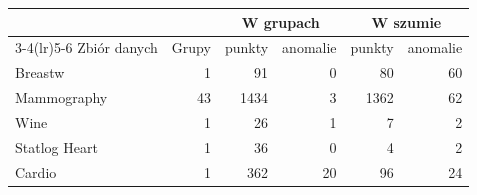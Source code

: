 \begin{tabular}{lrrrrr}
\toprule
 & & \multicolumn{2}{c}{W grupach} & \multicolumn{2}{c}{W szumie} \\
\cmidrule(lr){3-4}\cmidrule(lr){5-6}
Zbiór danych & Grupy & punkty & anomalie & punkty & anomalie \\
\midrule
Breastw & 1 & 91 & 0 & 80 & 60 \\
Mammography & 43 & 1434 & 3 & 1362 & 62 \\
Wine & 1 & 26 & 1 & 7 & 2 \\
Statlog Heart & 1 & 36 & 0 & 4 & 2 \\
Cardio & 1 & 362 & 20 & 96 & 24 \\
\bottomrule
\end{tabular}
